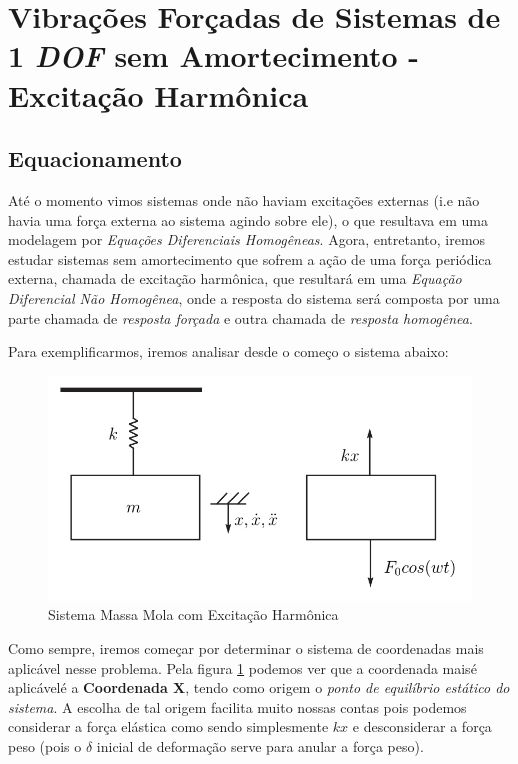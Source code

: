 \documentclass{article}
\begin{document}
        \section{Vibrações Forçadas de Sistemas de 1 \emph{DOF} sem Amortecimento - Excitação Harmônica}

            \subsection{Equacionamento}
                Até o momento vimos sistemas onde não haviam excitações externas (i.e não havia uma força externa ao sistema agindo sobre ele), o que resultava em uma modelagem por \emph{Equações
                Diferenciais Homogêneas}. Agora, entretanto, iremos estudar sistemas sem amortecimento que sofrem a ação de uma força periódica externa, chamada de excitação harmônica, que resultará em uma
                \emph{Equação Diferencial Não Homogênea}, onde a resposta do sistema será composta por uma parte chamada de \emph{resposta forçada} e outra chamada de \emph{resposta homogênea}.

                Para exemplificarmos, iremos analisar desde o começo o sistema abaixo:
                \begin{figure}[h]
                    \centering
                    \includegraphics[width=.5\textwidth]{imgs/sis_massa_mola_harmo.png}
                    \caption{Sistema Massa Mola com Excitação Harmônica}
                    \label{fig:sis_massa_mola_exci_armonica}
                \end{figure}


                Como sempre, iremos começar por determinar o sistema de coordenadas mais aplicável nesse problema. Pela figura \ref{fig:sis_massa_mola_exci_armonica} podemos ver que a coordenada maisé
                aplicávelé a \textbf{Coordenada X}, tendo como origem o \emph{ponto de equilíbrio estático do sistema}. A escolha de tal origem facilita muito nossas contas pois podemos considerar a força
                elástica como sendo simplesmente $kx$ e desconsiderar a força peso (pois o $\delta$ inicial de deformação serve para anular a força peso).
\end{document}
